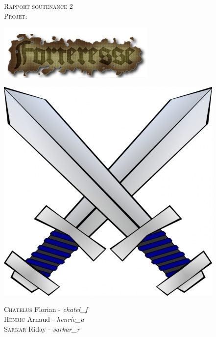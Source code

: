 \documentclass[a4paper, 12pt]{article}
\begin{document}
\begin{titlepage}
  \begin{sffamily}
  \begin{center}


    \textsc{\Huge Rapport soutenance 2}\\[3cm]

    \textsc{\LARGE Projet:}\\[1.5cm]

	\centerline{\includegraphics{coollogo_com-19602433.png}}
	\vfill{
	\centerline{\includegraphics[scale=0.4]{crossed-swords-clip-art-48219.jpg}}}

    \begin{minipage}{0.4\textwidth}
      \begin{flushleft} \large	
      
      \end{flushleft}
    \end{minipage}
	\begin{flushleft}\vfill
      {
       \textsc{Chatelus} Florian - \emph{chatel\_f} \\
       \textsc{Henric} Arnaud - \emph{henric\_a}\\
       \textsc{Sarkar} Riday - \emph{sarkar\_r}\\
       }
    \end{flushleft}	
  \end{center}
  \end{sffamily}
\end{titlepage}
\end{document}
